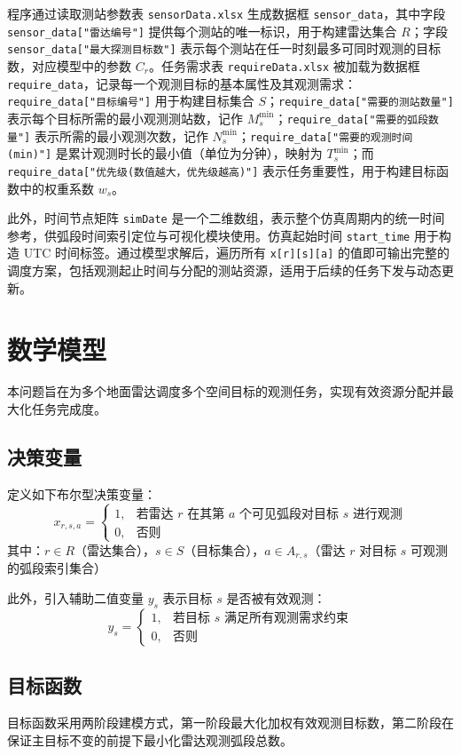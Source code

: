 \documentclass[openany,12pt,UTF8]{ctexart}
\begin{document}
程序通过读取测站参数表 \texttt{sensorData.xlsx} 生成数据框 \texttt{sensor\_data}，其中字段 \texttt{sensor\_data["雷达编号"]} 提供每个测站的唯一标识，用于构建雷达集合 $R$；字段 \texttt{sensor\_data["最大探测目标数"]} 表示每个测站在任一时刻最多可同时观测的目标数，对应模型中的参数 $C_r$。任务需求表 \texttt{requireData.xlsx} 被加载为数据框 \texttt{require\_data}，记录每一个观测目标的基本属性及其观测需求：\texttt{require\_data["目标编号"]} 用于构建目标集合 $S$；\texttt{require\_data["需要的测站数量"]} 表示每个目标所需的最小观测测站数，记作 $M_s^{\min}$；\texttt{require\_data["需要的弧段数量"]} 表示所需的最小观测次数，记作 $N_s^{\min}$；\texttt{require\_data["需要的观测时间(min)"]} 是累计观测时长的最小值（单位为分钟），映射为 $T_s^{\min}$；而 \texttt{require\_data["优先级(数值越大，优先级越高)"]} 表示任务重要性，用于构建目标函数中的权重系数 $w_s$。

此外，时间节点矩阵 \texttt{simDate} 是一个二维数组，表示整个仿真周期内的统一时间参考，供弧段时间索引定位与可视化模块使用。仿真起始时间 \texttt{start\_time} 用于构造 UTC 时间标签。通过模型求解后，遍历所有 \texttt{x[r][s][a]} 的值即可输出完整的调度方案，包括观测起止时间与分配的测站资源，适用于后续的任务下发与动态更新。

\section{数学模型}
本问题旨在为多个地面雷达调度多个空间目标的观测任务，实现有效资源分配并最大化任务完成度。

\subsection{决策变量}
定义如下布尔型决策变量：
$$
    x_{r,s,a} =
    \begin{cases}
        1, & \text{若雷达 } r \text{ 在其第 } a \text{ 个可见弧段对目标 } s \text{ 进行观测} \\
        0, & \text{否则}
    \end{cases}
$$
其中：$r \in R$（雷达集合），$s \in S$（目标集合），$a \in A_{r,s}$（雷达 $r$ 对目标 $s$ 可观测的弧段索引集合）

此外，引入辅助二值变量 $y_s$ 表示目标 $s$ 是否被有效观测：
$$
    y_s =
    \begin{cases}
        1, & \text{若目标 } s \text{ 满足所有观测需求约束} \\
        0, & \text{否则}
    \end{cases}
$$

\subsection{目标函数}
目标函数采用两阶段建模方式，第一阶段最大化加权有效观测目标数，第二阶段在保证主目标不变的前提下最小化雷达观测弧段总数。
\end{document}
